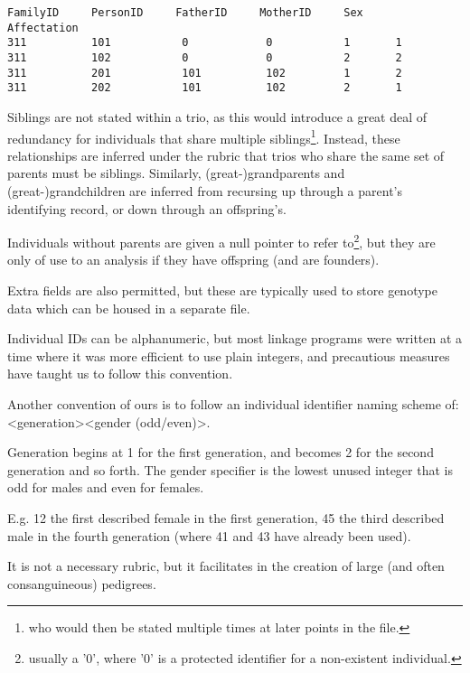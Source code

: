 \begingroup
\begin{lstlisting}[label=verb:pedfile]
FamilyID     PersonID     FatherID     MotherID     Sex     Affectation
311          101           0            0           1       1
311          102           0            0           2       2
311          201           101          102         1       2
311          202           101          102         2       1
\end{lstlisting}
\endgroup

Siblings are not stated within a trio, as this would introduce a great deal of redundancy for individuals that share multiple siblings\footnote{who would then be stated multiple times at later points in the file.}. Instead, these relationships are inferred under the rubric that trios who share the same set of parents must be siblings. Similarly, (great-)grandparents and (great-)grandchildren are inferred from recursing up through a parent's identifying record, or down through an offspring's.

Individuals without parents are given a null pointer to refer to\footnote{usually a '0', where '0' is a protected identifier for a non-existent individual.}, but they are only of use to an analysis if they have offspring (and are founders).


Extra fields are also permitted, but these are typically used to store genotype data which can be housed in a separate file.

Individual IDs can be alphanumeric, but most linkage programs were written at a time where it was more efficient to use plain integers, and precautious measures have taught us to follow this convention. 

Another convention of ours is to follow an individual identifier naming scheme of: <generation><gender (odd/even)>.

Generation begins at 1 for the first generation, and becomes 2 for the second generation and so forth. The gender specifier is the lowest unused integer that is odd for males and even for females.

E.g.  12 the first described female in the first generation, 45 the third described male in the fourth generation (where 41 and 43 have already been used).

It is not a necessary rubric, but it facilitates in the creation of large (and often consanguineous) pedigrees.

